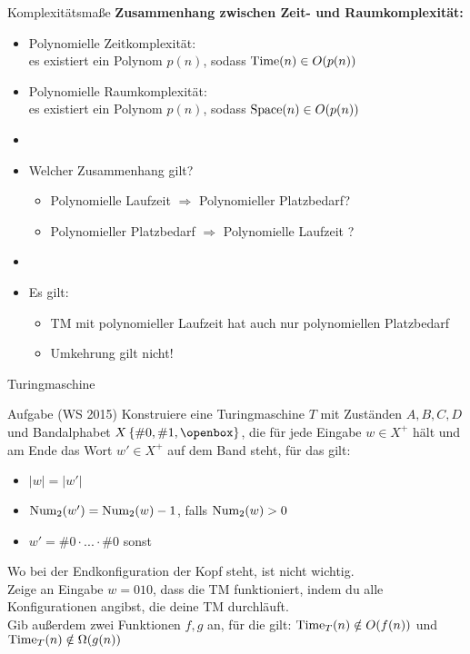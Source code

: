 \begin{frame}{Komplexitätsmaße}
    \textbf{Zusammenhang zwischen Zeit- und Raumkomplexität:}
    \begin{itemize}
    	\item Polynomielle Zeitkomplexität:\\
    	es existiert ein Polynom $p(n)$, sodass $\mathord{\text{Time}}(n) \in O(p(n))$
    	\item Polynomielle Raumkomplexität:\\
    	es existiert ein Polynom $p(n)$, sodass $\mathord{\text{Space}}(n) \in O(p(n))$
    	\pause
    	\item[]
    	\item Welcher Zusammenhang gilt?
    	\begin{itemize}
    		\item Polynomielle Laufzeit $\Rightarrow$ Polynomieller Platzbedarf?
    		\item Polynomieller Platzbedarf $\Rightarrow$ Polynomielle Laufzeit ?
    	\end{itemize}
    	\pause
    	\item[]
    	\item Es gilt:
    	\begin{itemize}
    		\item TM mit polynomieller Laufzeit hat auch nur polynomiellen Platzbedarf
    		\item Umkehrung gilt nicht!
    	\end{itemize}
    \end{itemize}
\end{frame}

\begin{frame}{Turingmaschine}
	\begin{exampleblock}{Aufgabe (WS 2015)}
		Konstruiere eine Turingmaschine $T$ mit Zuständen $A,B,C,D$ und Bandalphabet $X\set{\#0, \#1, \blank}$, die für jede Eingabe $w \in X^+$ hält und am Ende das Wort $w'\in X^+$ auf dem Band steht, für das gilt:
		\begin{itemize}
			\item $|w|=|w'|$
			\item ${\text{Num}}_2(w')={\text{Num}}_2(w)-1$, falls ${\text{Num}}_2(w)>0$
			\item $w' = \#0 \cdot ... \cdot \#0$ sonst
		\end{itemize}
		Wo bei der Endkonfiguration der Kopf steht, ist nicht wichtig.\\
		Zeige an Eingabe $w = 010$, dass die TM funktioniert, indem du alle Konfigurationen angibst, die deine TM durchläuft.\\
		Gib außerdem zwei Funktionen $f,g$ an, für die gilt: $\mathord{\text{Time}}_T(n) \notin O(f(n))$ und $\mathord{\text{Time}}_T(n)\notin \Omega(g(n))$
	\end{exampleblock}
\end{frame}

